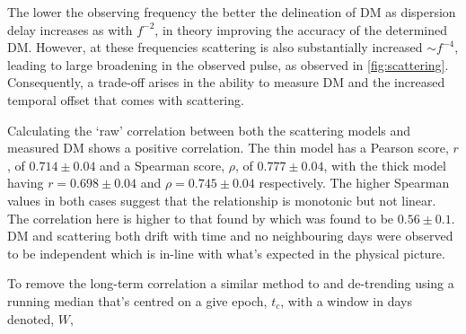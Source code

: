 The lower the observing frequency the better the delineation of DM as dispersion delay increases as with $f^{-2}$, in theory improving the accuracy of the determined DM. However, at these frequencies scattering is also substantially increased $\sim f^{-4}$, leading to large broadening in the observed pulse, as observed in \cref{fig:scattering}. Consequently, a trade-off arises in the ability to measure DM and the increased temporal offset that comes with scattering.  

Calculating the `raw' correlation between both the scattering models and measured DM shows a positive correlation. The thin model has a Pearson score, $r$, of $0.714 \pm 0.04$ and a Spearman score, $\rho$, of $0.777 \pm 0.04$, with the thick model having $r = 0.698 \pm 0.04$ and $\rho = 0.745 \pm 0.04$ respectively. The higher Spearman values in both cases suggest that the relationship is monotonic but not linear. The correlation here is higher to that found by \cite{mckee_temporal_2018} which was found to be $0.56\pm 0.1$. DM and scattering both drift with time and no neighbouring days were observed to be independent which is in-line with what's expected in the physical picture. 





To remove the long-term correlation a similar method to \cite{mckee_temporal_2018} and \cite{lam_systematic_2016} de-trending using a running median  that's centred on a give epoch, $t_c$, with a window in days denoted, $W$, 

